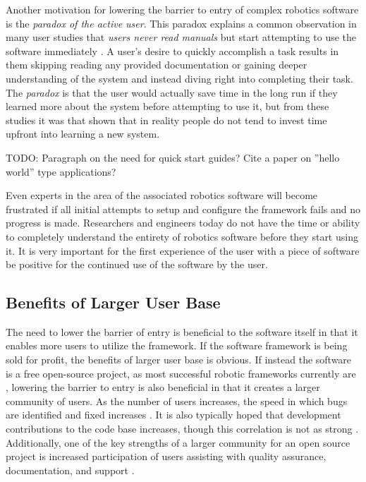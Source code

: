 \documentclass[10pt,journal,compsoc]{joser1}
\begin{document}
{Another motivation for lowering the barrier to entry of complex robotics software is the \textit{paradox of the active user}. This paradox explains a common observation in many user studies that \textit{users never read manuals} but start attempting to use the software immediately \cite{carroll1987interfacing}. A user's desire to quickly accomplish a task results in them skipping reading any provided documentation or gaining deeper understanding of the system and instead diving right into completing their task. The \textit{paradox} is that the user would actually save time in the long run if they learned more about the system before attempting to use it, but from these studies it was that shown that in reality people do not tend to invest time upfront into learning a new system.

TODO: Paragraph on the need for quick start guides? Cite a paper on ''hello world'' type applications?

Even experts in the area of the associated robotics software will become frustrated if all initial attempts to setup and configure the framework fails and no progress is made. Researchers and engineers today do not have the time or ability to completely understand the entirety of robotics software before they start using it. It is very important for the first experience of the user with a piece of software be positive for the continued use of the software by the user.

\subsection{Benefits of Larger User Base}

The need to lower the barrier of entry is beneficial to the software itself in that it enables more users to utilize the framework. If the software framework is being sold for profit, the benefits of larger user base is obvious. If instead the software is a free open-source project, as most successful robotic frameworks currently are \cite{makarenko2007benefits}, lowering the barrier to entry is also beneficial in that it creates a larger community of users. As the number of users increases, the speed in which bugs are identified and fixed increases \cite{schmidt1999software}. It is also typically hoped that development contributions to the code base increases, though this correlation is not as strong \cite{schmidt1999software}. Additionally, one of the key strengths of a larger community for an open source project is increased participation of users assisting with quality assurance, documentation, and support \cite{schmidt2001leveraging}.

}
\end{document}
